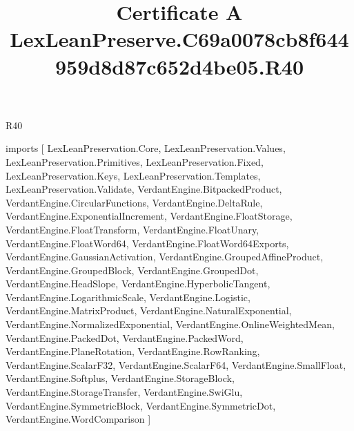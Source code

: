 \begin{lexlean}{R40}
\title{Certificate A LexLeanPreserve.C69a0078cb8f644959d8d87c652d4be05.R40}
\begin{coremodule}
imports [
  LexLeanPreservation.Core,
  LexLeanPreservation.Values,
  LexLeanPreservation.Primitives,
  LexLeanPreservation.Fixed,
  LexLeanPreservation.Keys,
  LexLeanPreservation.Templates,
  LexLeanPreservation.Validate,
  VerdantEngine.BitpackedProduct,
  VerdantEngine.CircularFunctions,
  VerdantEngine.DeltaRule,
  VerdantEngine.ExponentialIncrement,
  VerdantEngine.FloatStorage,
  VerdantEngine.FloatTransform,
  VerdantEngine.FloatUnary,
  VerdantEngine.FloatWord64,
  VerdantEngine.FloatWord64Exports,
  VerdantEngine.GaussianActivation,
  VerdantEngine.GroupedAffineProduct,
  VerdantEngine.GroupedBlock,
  VerdantEngine.GroupedDot,
  VerdantEngine.HeadSlope,
  VerdantEngine.HyperbolicTangent,
  VerdantEngine.LogarithmicScale,
  VerdantEngine.Logistic,
  VerdantEngine.MatrixProduct,
  VerdantEngine.NaturalExponential,
  VerdantEngine.NormalizedExponential,
  VerdantEngine.OnlineWeightedMean,
  VerdantEngine.PackedDot,
  VerdantEngine.PackedWord,
  VerdantEngine.PlaneRotation,
  VerdantEngine.RowRanking,
  VerdantEngine.ScalarF32,
  VerdantEngine.ScalarF64,
  VerdantEngine.SmallFloat,
  VerdantEngine.Softplus,
  VerdantEngine.StorageBlock,
  VerdantEngine.StorageTransfer,
  VerdantEngine.SwiGlu,
  VerdantEngine.SymmetricBlock,
  VerdantEngine.SymmetricDot,
  VerdantEngine.WordComparison
]


\end{coremodule}
\end{lexlean}
